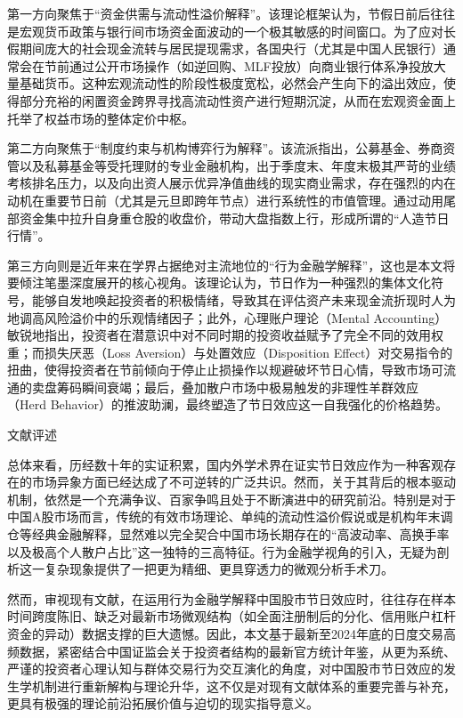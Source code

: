\documentclass{cupb-thesis}
\begin{document}
第一方向聚焦于“资金供需与流动性溢价解释”。该理论框架认为，节假日前后往往是宏观货币政策与银行间市场资金面波动的一个极其敏感的时间窗口。为了应对长假期间庞大的社会现金流转与居民提现需求，各国央行（尤其是中国人民银行）通常会在节前通过公开市场操作（如逆回购、MLF投放）向商业银行体系净投放大量基础货币。这种宏观流动性的阶段性极度宽松，必然会产生向下的溢出效应，使得部分充裕的闲置资金跨界寻找高流动性资产进行短期沉淀，从而在宏观资金面上托举了权益市场的整体定价中枢。


第二方向聚焦于“制度约束与机构博弈行为解释”。该流派指出，公募基金、券商资管以及私募基金等受托理财的专业金融机构，出于季度末、年度末极其严苛的业绩考核排名压力，以及向出资人展示优异净值曲线的现实商业需求，存在强烈的内在动机在重要节日前（尤其是元旦即跨年节点）进行系统性的市值管理。通过动用尾部资金集中拉升自身重仓股的收盘价，带动大盘指数上行，形成所谓的“人造节日行情”。


第三方向则是近年来在学界占据绝对主流地位的“行为金融学解释”，这也是本文将要倾注笔墨深度展开的核心视角。该理论认为，节日作为一种强烈的集体文化符号，能够自发地唤起投资者的积极情绪，导致其在评估资产未来现金流折现时人为地调高风险溢价中的乐观情绪因子；此外，心理账户理论（Mental Accounting）敏锐地指出，投资者在潜意识中对不同时期的投资收益赋予了完全不同的效用权重；而损失厌恶（Loss Aversion）与处置效应（Disposition Effect）对交易指令的扭曲，使得投资者在节前倾向于停止止损操作以规避破坏节日心情，导致市场可流通的卖盘筹码瞬间衰竭；最后，叠加散户市场中极易触发的非理性羊群效应（Herd Behavior）的推波助澜，最终塑造了节日效应这一自我强化的价格趋势。


文献评述

总体来看，历经数十年的实证积累，国内外学术界在证实节日效应作为一种客观存在的市场异象方面已经达成了不可逆转的广泛共识。然而，关于其背后的根本驱动机制，依然是一个充满争议、百家争鸣且处于不断演进中的研究前沿。特别是对于中国A股市场而言，传统的有效市场理论、单纯的流动性溢价假说或是机构年末调仓等经典金融解释，显然难以完全契合中国市场长期存在的“高波动率、高换手率以及极高个人散户占比”这一独特的三高特征。行为金融学视角的引入，无疑为剖析这一复杂现象提供了一把更为精细、更具穿透力的微观分析手术刀。


然而，审视现有文献，在运用行为金融学解释中国股市节日效应时，往往存在样本时间跨度陈旧、缺乏对最新市场微观结构（如全面注册制后的分化、信用账户杠杆资金的异动）数据支撑的巨大遗憾。因此，本文基于最新至2024年底的日度交易高频数据，紧密结合中国证监会关于投资者结构的最新官方统计年鉴，从更为系统、严谨的投资者心理认知与群体交易行为交互演化的角度，对中国股市节日效应的发生学机制进行重新解构与理论升华，这不仅是对现有文献体系的重要完善与补充，更具有极强的理论前沿拓展价值与迫切的现实指导意义。
\end{document}
